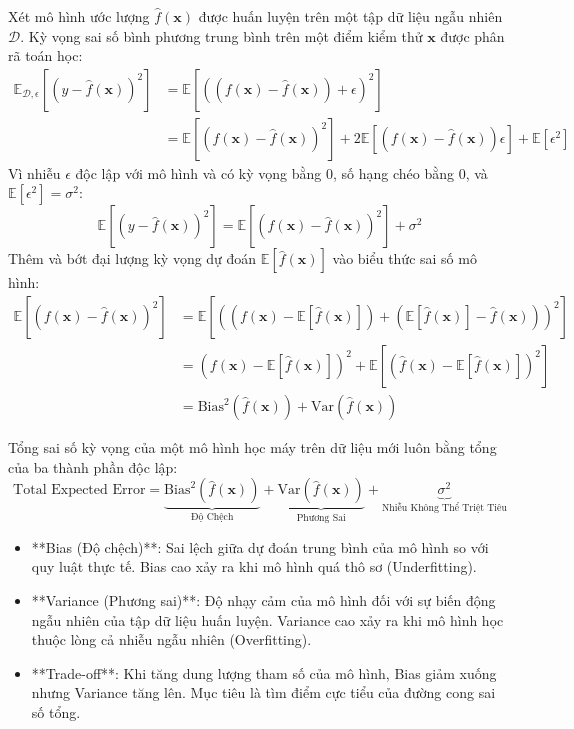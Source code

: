 Xét mô hình ước lượng $\hat{f}(\mathbf{x})$ được huấn luyện trên một tập dữ liệu ngẫu nhiên $\mathcal{D}$. Kỳ vọng sai số bình phương trung bình trên một điểm kiểm thử $\mathbf{x}$ được phân rã toán học:
\begin{align}
\mathbb{E}_{\mathcal{D}, \epsilon}[(y - \hat{f}(\mathbf{x}))^2] &= \mathbb{E}[( (f(\mathbf{x}) - \hat{f}(\mathbf{x})) + \epsilon )^2] \nonumber \\
&= \mathbb{E}[(f(\mathbf{x}) - \hat{f}(\mathbf{x}))^2] + 2 \mathbb{E}[(f(\mathbf{x}) - \hat{f}(\mathbf{x}))\epsilon] + \mathbb{E}[\epsilon^2]
\end{align}
Vì nhiễu $\epsilon$ độc lập với mô hình và có kỳ vọng bằng 0, số hạng chéo bằng 0, và $\mathbb{E}[\epsilon^2] = \sigma^2$:
\begin{equation}
\mathbb{E}[(y - \hat{f}(\mathbf{x}))^2] = \mathbb{E}[(f(\mathbf{x}) - \hat{f}(\mathbf{x}))^2] + \sigma^2
\end{equation}
Thêm và bớt đại lượng kỳ vọng dự đoán $\mathbb{E}[\hat{f}(\mathbf{x})]$ vào biểu thức sai số mô hình:
\begin{align}
\mathbb{E}[(f(\mathbf{x}) - \hat{f}(\mathbf{x}))^2] &= \mathbb{E}[ ( (f(\mathbf{x}) - \mathbb{E}[\hat{f}(\mathbf{x})]) + (\mathbb{E}[\hat{f}(\mathbf{x})] - \hat{f}(\mathbf{x})) )^2 ] \nonumber \\
&= (f(\mathbf{x}) - \mathbb{E}[\hat{f}(\mathbf{x})])^2 + \mathbb{E}[(\hat{f}(\mathbf{x}) - \mathbb{E}[\hat{f}(\mathbf{x})])^2] \nonumber \\
&= \text{Bias}^2(\hat{f}(\mathbf{x})) + \text{Var}(\hat{f}(\mathbf{x}))
\end{align}

\begin{theorem}
Tổng sai số kỳ vọng của một mô hình học máy trên dữ liệu mới luôn bằng tổng của ba thành phần độc lập:
\begin{equation}
\text{Total Expected Error} = \underbrace{\text{Bias}^2(\hat{f}(\mathbf{x}))}_{\text{Độ Chệch}} + \underbrace{\text{Var}(\hat{f}(\mathbf{x}))}_{\text{Phương Sai}} + \underbrace{\sigma^2}_{\text{Nhiễu Không Thể Triệt Tiêu}}
\label{eq:bias-variance-decomposition}
\end{equation}
\end{theorem}

\begin{itemize}
  \item **Bias (Độ chệch)**: Sai lệch giữa dự đoán trung bình của mô hình so với quy luật thực tế. Bias cao xảy ra khi mô hình quá thô sơ (Underfitting).
  \item **Variance (Phương sai)**: Độ nhạy cảm của mô hình đối với sự biến động ngẫu nhiên của tập dữ liệu huấn luyện. Variance cao xảy ra khi mô hình học thuộc lòng cả nhiễu ngẫu nhiên (Overfitting).
  \item **Trade-off**: Khi tăng dung lượng tham số của mô hình, Bias giảm xuống nhưng Variance tăng lên. Mục tiêu là tìm điểm cực tiểu của đường cong sai số tổng.
\end{itemize}

